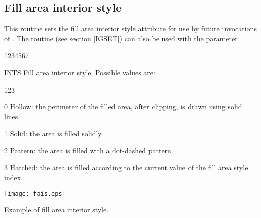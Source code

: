 \subsection{Fill area interior style}
\Action
This routine sets the fill area interior style attribute for use by future
invocations of . The routine  (see section \ref{IGSET})
can also be used with the parameter .
\Pdesc
\begin{DLtt}{1234567}
\item[INTS] Fill area interior style. Possible values are:
\begin{DLtt}{123}
\item[0] Hollow: the perimeter of the filled area, after clipping, is drawn
         using solid lines.
\item[1] Solid: the area is filled solidly.
\item[2] Pattern: the area is filled with a dot-dashed pattern.
\item[3] Hatched: the area is filled according to the current
value of the fill area style index.
\end{DLtt}
\end{DLtt}
\begin{Fighere}
\texttt{[image: fais.eps]}
\caption{Example of fill area interior style.}
\label{FILL-IS}
\end{Fighere}
%
\newpage
